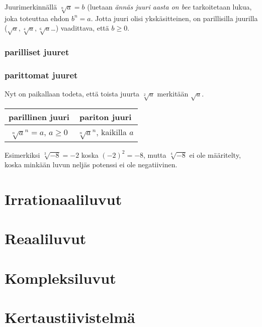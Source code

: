 Juurimerkinnällä $\sqrt[n]{a}=b$ (luetaan \emph{ännäs juuri aasta on bee} tarkoitetaan lukua, joka toteuttaa ehdon $b^n = a$. Jotta juuri olisi ykskäsitteinen, on parillisilla juurilla ($\sqrt{a}, \sqrt[4]{a}, \sqrt[6]{a}$\ldots) vaadittava, että $b\ge0$.

\subsection{parilliset juuret}


\subsection{parittomat juuret}

Nyt on paikallaan todeta, että toista juurta $\sqrt[2]{a}$ merkitään $\sqrt{a}$.

\begin{tabular}{c|c}
parillinen juuri & pariton juuri\\
\hline
$\sqrt[n]{a}^n=a$, $a\ge0$ & $\sqrt[n]{a}^n$, kaikilla $a$
\end{tabular}

Esimerkiksi $\sqrt[3]{-8}=-2$ koska $(-2)^2=-8$, mutta $\sqrt[4]{-8}$ ei ole määritelty, koska minkään luvun neljäs potenssi ei ole negatiivinen.

%


\chapter{Irrationaaliluvut}
\chapter{Reaaliluvut}
\chapter{Kompleksiluvut}
\chapter{Kertaustiivistelmä}
